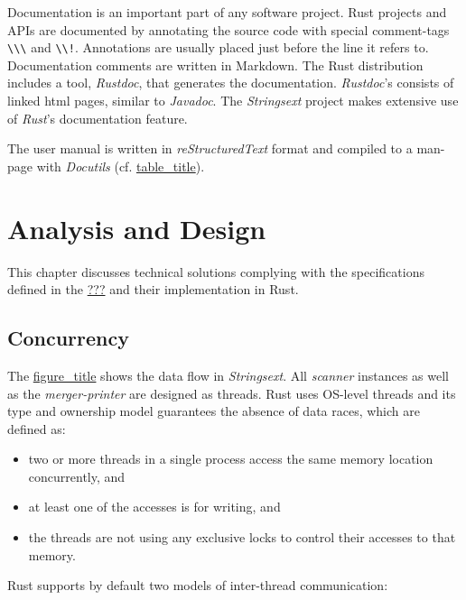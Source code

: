 Documentation is an important part of any software project. Rust
projects and APIs are documented by annotating the source code with
special comment-tags
\texttt{\textbackslash{}\textbackslash{}\textbackslash{}} and
\texttt{\textbackslash{}\textbackslash{}!}. Annotations are usually
placed just before the line it refers to. Documentation comments are
written in Markdown. The Rust distribution includes a tool,
\emph{Rustdoc}, that generates the documentation. \emph{Rustdoc}'s
consists of linked html pages, similar to \emph{Javadoc}. The
\emph{Strings­ext} project makes extensive use of \emph{Rust}'s
documentation feature.

The user manual is written in \emph{reStructuredText} format and
compiled to a man-page with \emph{Docutils} (cf.
\protect\hyperlink{stringsext-s-manual-page}{table\_title}).

\hypertarget{_analysis_and_design}{\section{Analysis and
Design}\label{_analysis_and_design}}

This chapter discusses technical solutions complying with the
specifications defined in the \protect\hyperlink{_specifications}{???}
and their implementation in Rust.

\hypertarget{_concurrency}{\subsection{Concurrency}\label{_concurrency}}

The \protect\hyperlink{data-processing-and-threads}{figure\_title} shows
the data flow in \emph{Strings­ext}. All \emph{scanner} instances as
well as the \emph{merger-printer} are designed as threads. Rust uses
OS-level threads and its type and ownership model guarantees the absence
of data races, which are defined as:

\begin{itemize}
\item
  two or more threads in a single process access the same memory
  location concurrently, and
\item
  at least one of the accesses is for writing, and
\item
  the threads are not using any exclusive locks to control their
  accesses to that memory.
\end{itemize}

Rust supports by default two models of inter-thread communication:


